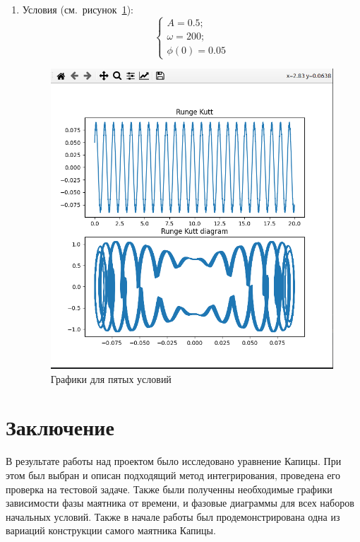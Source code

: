 \documentclass[a4paper,12pt]{article}
\begin{document}
\begin{enumerate}
		\item Условия (см.~рисунок~\ref{fig:5_praq}):
		\begin{equation}
			\begin{cases}
				A = 0.5; \\
				\omega = 200; \\
				\phi(0) = 0.05
			\end{cases}
		\end{equation}
		\begin{figure}[ht!]
			\begin{center}
			\includegraphics[scale=0.3]{sources/5_praq.png}
			\end{center}
			\vspace*{-8mm}
			\caption{Графики для пятых условий}\label{fig:5_praq}
	  	\end{figure}

	\end{enumerate}


	\newpage
	
	\section{Заключение}

	В результате работы над проектом было исследовано уравнение Капицы. При
	этом был выбран и описан подходящий метод интегрирования, проведена его
	проверка на тестовой задаче. Также были полученны необходимые графики 
	зависимости фазы маятника от времени, и фазовые диаграммы для всех 
	наборов начальных условий. Также в начале работы был продемонстрирована 
	одна из вариаций конструкции самого маятника Капицы.
\end{document}
